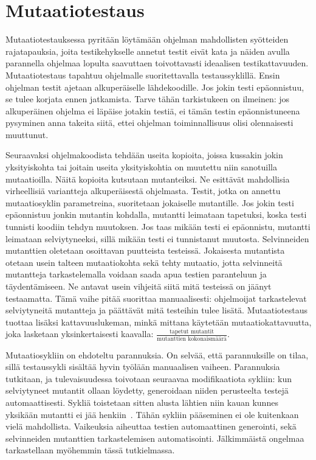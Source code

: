 \documentclass{tktltiki}
\begin{document}
\section{Mutaatiotestaus}
Mutaatiotestauksessa pyritään löytämään ohjelman mahdollisten syötteiden rajatapauksia, joita testikehykselle annetut testit eivät kata ja näiden avulla parannella ohjelmaa lopulta saavuttaen toivottavasti ideaalisen testikattavuuden. Mutaatiotestaus tapahtuu ohjelmalle suoritettavalla testaussyklillä. Ensin ohjelman testit ajetaan alkuperäiselle lähdekoodille. Jos jokin testi epäonnistuu, se tulee korjata ennen jatkamista. Tarve tähän tarkistukeen on ilmeinen: jos alkuperäinen ohjelma ei läpäise jotakin testiä, ei tämän testin epäonnistuneena pysyminen anna takeita siitä, ettei ohjelman toiminnallisuus olisi olennaisesti muuttunut.

Seuraavaksi ohjelmakoodista tehdään useita kopioita, joissa kussakin jokin yksityiskohta tai joitain useita yksityiskohtia on muutettu niin sanotuilla mutaatioilla. Näitä kopioita kutsutaan mutanteiksi. Ne esittävät mahdollisia virheellisiä variantteja alkuperäisestä ohjelmasta. Testit, jotka on annettu mutaatiosyklin parametreina, suoritetaan jokaiselle mutantille. Jos jokin testi epäonnistuu jonkin mutantin kohdalla, mutantti leimataan tapetuksi, koska testi tunnisti koodiin tehdyn muutoksen. Jos taas mikään testi ei epäonnistu, mutantti leimataan selviytyneeksi, sillä mikään testi ei tunnistanut muutosta. Selvinneiden mutanttien oletetaan osoittavan puutteista testeissä. Jokaisesta mutantista otetaan usein talteen mutaatiokohta sekä tehty mutaatio, jotta selvinneitä mutantteja tarkastelemalla voidaan saada apua testien paranteluun ja täydentämiseen. Ne antavat usein vihjeitä siitä mitä testeissä on jäänyt testaamatta. Tämä vaihe pitää suorittaa manuaalisesti: ohjelmoijat tarkastelevat selviytyneitä mutantteja ja päättävät mitä testeihin tulee lisätä. Mutaatiotestaus tuottaa lisäksi kattavuuslukeman, minkä mittana käytetään mutaatiokattavuutta, joka lasketaan yksinkertaisesti kaavalla: $\frac{\text{tapetut mutantit}}{\text{mutanttien kokonaismäärä}}$.

Mutaatiosykliin on ehdoteltu parannuksia. On selvää, että parannuksille on tilaa, sillä testaussykli sisältää hyvin työlään manuaalisen vaiheen. Parannuksia tutkitaan, ja tulevaisuudessa toivotaan seuraavaa modifikaatiota sykliin: kun selviytyneet mutantit ollaan löydetty, generoidaan niiden perusteelta testejä automaattisesti. Sykliä toistetaan sitten alusta lähtien niin kauan kunnes yksikään mutantti ei jää henkiin~\cite{}. Tähän sykliin pääseminen ei ole kuitenkaan vielä mahdollista. Vaikeuksia aiheuttaa testien automaattinen generointi, sekä selvinneiden mutanttien tarkastelemisen automatisointi. Jälkimmäistä ongelmaa tarkastellaan myöhemmin tässä tutkielmassa.
\end{document}
